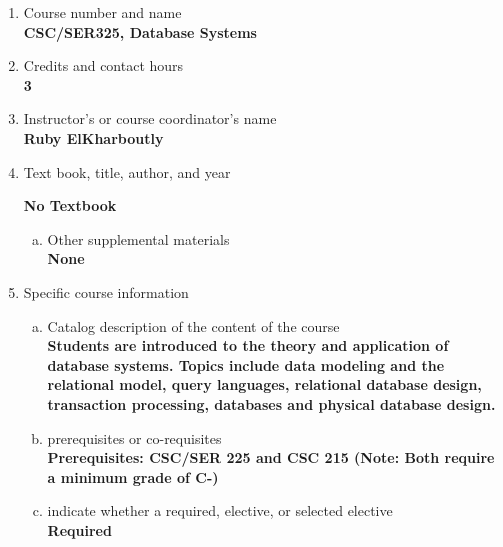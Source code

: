 \label{SER325}  %
\begin{enumerate}[1.]
\item Course number and name\\
  {\bfseries
    CSC/SER325, Database Systems
  }

\item Credits and contact hours\\
  {\bfseries
    3
  }

\item Instructor's or course coordinator's name\\
  {\bfseries
    Ruby ElKharboutly
  }

\item Text book, title, author, and year\\
  {\bfseries
	No Textbook

  }
\begin{enumerate}[a.]
\item Other supplemental materials\\
  {\bfseries
    None
  }
\end{enumerate}

\item Specific course information
\begin{enumerate}[a.]
\item Catalog description of the content of the course\\
  {\bfseries
    Students are introduced to the theory and application of database systems. Topics include data modeling and the relational model, query languages, relational database design, transaction processing, databases and physical database design.
    }
\item prerequisites or co-requisites\\
  {\bfseries
    Prerequisites: CSC/SER 225 and CSC 215 (Note: Both require a minimum grade of C-)
  }

\item indicate whether a required, elective, or selected elective\\ %
  {\bfseries
    Required
  }


\end{enumerate}
\end{enumerate}

